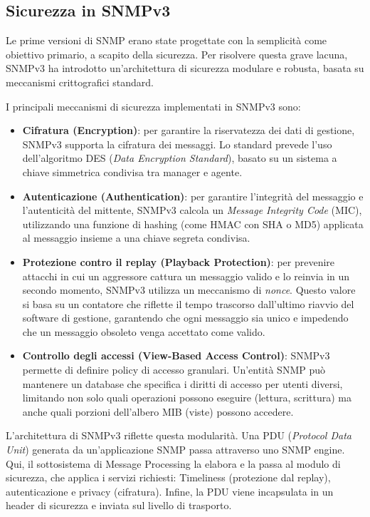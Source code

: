 \subsection{Sicurezza in SNMPv3}

Le prime versioni di SNMP erano state progettate con la semplicità come obiettivo
primario, a scapito della sicurezza. Per risolvere questa grave lacuna,
SNMPv3 ha introdotto un'architettura di sicurezza modulare e robusta, basata su
meccanismi crittografici standard.

I principali meccanismi di sicurezza implementati in SNMPv3 sono:

\begin{itemize}
\item \textbf{Cifratura (Encryption)}: per garantire la riservatezza dei dati
di gestione, SNMPv3 supporta la cifratura dei messaggi. Lo standard prevede
l'uso dell'algoritmo DES (\textit{Data Encryption Standard}), basato su un
sistema a chiave simmetrica condivisa tra manager e agente.
\item \textbf{Autenticazione (Authentication)}: per garantire l'integrità del
messaggio e l'autenticità del mittente, SNMPv3 calcola un
\textit{Message Integrity Code} (MIC), utilizzando una funzione di hashing
(come HMAC con SHA o MD5) applicata al messaggio insieme a una chiave segreta
condivisa.
\item \textbf{Protezione contro il replay (Playback Protection)}: per prevenire
attacchi in cui un aggressore cattura un messaggio valido e lo reinvia in un
secondo momento, SNMPv3 utilizza un meccanismo di \textit{nonce}. Questo
valore si basa su un contatore che riflette il tempo trascorso dall'ultimo
riavvio del software di gestione, garantendo che ogni messaggio sia unico e
impedendo che un messaggio obsoleto venga accettato come valido.
\item \textbf{Controllo degli accessi (View-Based Access Control)}: SNMPv3
permette di definire policy di accesso granulari. Un'entità SNMP può
mantenere un database che specifica i diritti di accesso per utenti diversi,
limitando non solo quali operazioni possono eseguire (lettura, scrittura) ma
anche quali porzioni dell'albero MIB (viste) possono accedere.
\end{itemize}

L'architettura di SNMPv3 riflette questa modularità. Una PDU
(\textit{Protocol Data Unit}) generata da un'applicazione SNMP passa attraverso
uno SNMP engine. Qui, il sottosistema di Message Processing la elabora e la
passa al modulo di sicurezza, che applica i servizi richiesti: Timeliness
(protezione dal replay), autenticazione e privacy (cifratura). Infine, la PDU
viene incapsulata in un header di sicurezza e inviata sul livello di trasporto.

